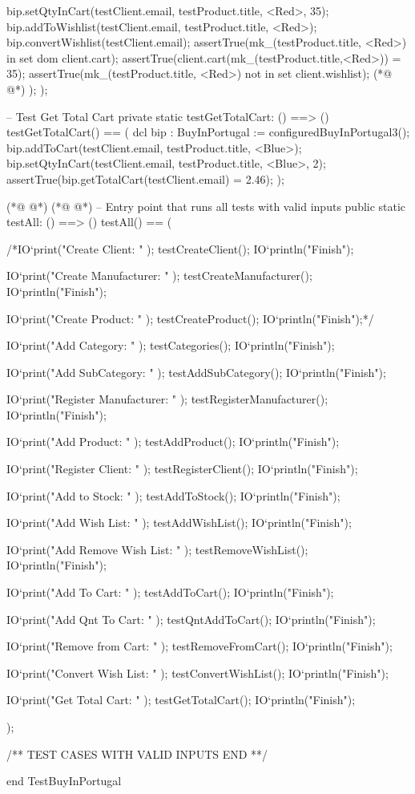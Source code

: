 \begin{vdmpp}[breaklines=true]
   bip.setQtyInCart(testClient.email, testProduct.title, <Red>, 35);
   bip.addToWishlist(testClient.email, testProduct.title, <Red>);
    bip.convertWishlist(testClient.email);
    assertTrue(mk_(testProduct.title, <Red>) in set dom client.cart);
    assertTrue(client.cart(mk_(testProduct.title,<Red>)) = 35);
    assertTrue(mk_(testProduct.title, <Red>) not in set client.wishlist);
(*@
\label{testGetTotalCart:332}
@*)
  );
 );
 
 -- Test Get Total Cart
 private static testGetTotalCart: () ==> ()
 testGetTotalCart() == (
  dcl bip : BuyInPortugal := configuredBuyInPortugal3();
  bip.addToCart(testClient.email, testProduct.title, <Blue>);
  bip.setQtyInCart(testClient.email, testProduct.title, <Blue>, 2);
  assertTrue(bip.getTotalCart(testClient.email) = 2.46);
 );
 
 
(*@
\label{testAll:345}
@*)
(*@
\label{main:345}
@*)
 -- Entry point that runs all tests with valid inputs
 public static testAll: () ==> ()
 testAll() ==
 (

   /*IO`print("Create Client: " );
    testCreateClient();
    IO`println("Finish");
   
    IO`print("Create Manufacturer: " );
    testCreateManufacturer();
    IO`println("Finish");
    
    IO`print("Create Product: " );
    testCreateProduct();
    IO`println("Finish");*/
    
    IO`print("Add Category: " );
    testCategories();
    IO`println("Finish");
    
    IO`print("Add SubCategory: " );
    testAddSubCategory();
    IO`println("Finish");
    
    IO`print("Register Manufacturer: " );
    testRegisterManufacturer();
    IO`println("Finish");
    
   IO`print("Add Product: " );
    testAddProduct();
    IO`println("Finish");
    
    IO`print("Register Client: " );
    testRegisterClient();
    IO`println("Finish");

    IO`print("Add to Stock: " );
    testAddToStock();
    IO`println("Finish");
    
    IO`print("Add Wish List: " );
    testAddWishList();
    IO`println("Finish");

   IO`print("Add Remove Wish List: " );
    testRemoveWishList();
    IO`println("Finish");
    
    IO`print("Add To Cart: " );
    testAddToCart();
    IO`println("Finish");

    IO`print("Add Qnt To Cart: " );
    testQntAddToCart();
    IO`println("Finish");

   IO`print("Remove from Cart: " );
    testRemoveFromCart();
    IO`println("Finish");
    
    IO`print("Convert Wish List: " );
    testConvertWishList();
    IO`println("Finish");

   IO`print("Get Total Cart: " );
    testGetTotalCart();
    IO`println("Finish");
   

  );
  
 
 /** TEST CASES WITH VALID INPUTS END **/

end TestBuyInPortugal
\end{vdmpp}
